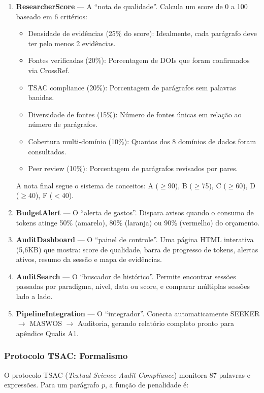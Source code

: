\documentclass[12pt,a4paper]{article}
\begin{document}
\begin{enumerate}[itemsep=2pt]
  \item \textbf{ResearcherScore} --- A ``nota de qualidade''. Calcula um score de 0 a 100 baseado em 6 critérios:
  \begin{itemize}
    \item Densidade de evidências (25\% do score): Idealmente, cada parágrafo deve ter pelo menos 2 evidências.
    \item Fontes verificadas (20\%): Porcentagem de DOIs que foram confirmados via CrossRef.
    \item TSAC compliance (20\%): Porcentagem de parágrafos sem palavras banidas.
    \item Diversidade de fontes (15\%): Número de fontes únicas em relação ao número de parágrafos.
    \item Cobertura multi-domínio (10\%): Quantos dos 8 domínios de dados foram consultados.
    \item Peer review (10\%): Porcentagem de parágrafos revisados por pares.
  \end{itemize}
  A nota final segue o sistema de conceitos: A ($\geq$90), B ($\geq$75), C ($\geq$60), D ($\geq$40), F ($<$40).

  \item \textbf{BudgetAlert} --- O ``alerta de gastos''. Dispara avisos quando o consumo de tokens atinge 50\% (amarelo), 80\% (laranja) ou 90\% (vermelho) do orçamento.

  \item \textbf{AuditDashboard} --- O ``painel de controle''. Uma página HTML interativa (5,6KB) que mostra: score de qualidade, barra de progresso de tokens, alertas ativos, resumo da sessão e mapa de evidências.

  \item \textbf{AuditSearch} --- O ``buscador de histórico''. Permite encontrar sessões passadas por paradigma, nível, data ou score, e comparar múltiplas sessões lado a lado.

  \item \textbf{PipelineIntegration} --- O ``integrador''. Conecta automaticamente SEEKER $\rightarrow$ MASWOS $\rightarrow$ Auditoria, gerando relatório completo pronto para apêndice Qualis A1.
\end{enumerate}

\subsubsection{Protocolo TSAC: Formalismo}

O protocolo TSAC (\textit{Textual Science Audit Compliance}) monitora 87 palavras e expressões. Para um parágrafo $p$, a função de penalidade é:
\end{document}
